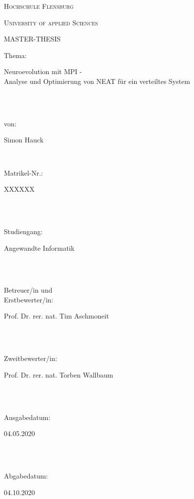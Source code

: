 \documentclass[12pt,a4paper]{scrreprt}
\begin{document}
\begin{titlepage}
	\centerline{{\scshape\LARGE Hochschule Flensburg}}
	\vspace{0.3cm}
	\centerline{{\scshape\LARGE University of applied Sciences}}
	\vspace{3cm}
	\centerline{{\scshape\Huge MASTER-THESIS}}
	\vspace{3cm}
	
	\large 
	{\Large
		\noindent
		\parbox[t]{1.5cm}{Thema:}   \quad\quad \parbox[t]{11cm}{Neuroevolution mit MPI - \\
			\normalsize Analyse und Optimierung von NEAT für ein verteiltes System }\\
		\vspace{0.5cm}\\
		\parbox[t]{1.5cm}{von:}   \quad\quad \parbox[t]{11cm}{Simon Hauck}\\
	} 
	
	\vspace{2.5cm}
	\noindent
	\parbox[t]{6cm}{Matrikel-Nr.:}  \quad\quad \quad\quad  \parbox[t]{11cm}{XXXXXX}\\\\
	\parbox[t]{6cm}{Studiengang:}   \quad\quad \quad\quad \parbox[t]{11cm}{Angewandte Informatik}\\\\
	\parbox[t]{6cm}{Betreuer/in und \\Erstbewerter/in:}    \quad\quad\quad\quad \parbox[t]{11cm}{\vspace{0.2cm}Prof. Dr. rer. nat. Tim Aschmoneit}\\\\
	\parbox[t]{6cm}{Zweitbewerter/in:}   \quad\quad \quad\quad \parbox[t]{11cm}{Prof. Dr. rer. nat. Torben Wallbaum}\\\\
	\parbox[t]{6cm}{Ausgabedatum:}   \quad\quad \quad\quad \parbox[t]{11cm}{04.05.2020}\\\\
	\parbox[t]{6cm}{Abgabedatum:}   \quad\quad \quad\quad \parbox[t]{11cm}{04.10.2020}\\\\
	\vfill
	
\end{titlepage}



\tableofcontents
\listoffigures


\newpage
{}










\end{document}
